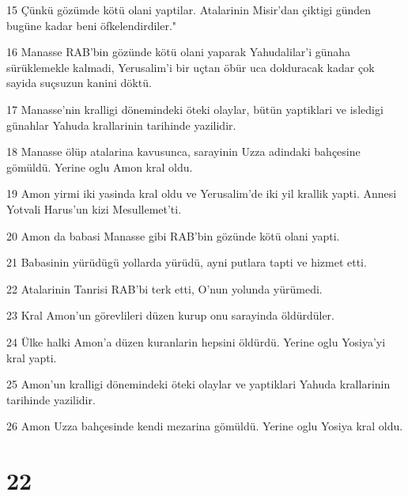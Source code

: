 \par 15 Çünkü gözümde kötü olani yaptilar. Atalarinin Misir'dan çiktigi günden bugüne kadar beni öfkelendirdiler."
\par 16 Manasse RAB'bin gözünde kötü olani yaparak Yahudalilar'i günaha sürüklemekle kalmadi, Yerusalim'i bir uçtan öbür uca dolduracak kadar çok sayida suçsuzun kanini döktü.
\par 17 Manasse'nin kralligi dönemindeki öteki olaylar, bütün yaptiklari ve isledigi günahlar Yahuda krallarinin tarihinde yazilidir.
\par 18 Manasse ölüp atalarina kavusunca, sarayinin Uzza adindaki bahçesine gömüldü. Yerine oglu Amon kral oldu.
\par 19 Amon yirmi iki yasinda kral oldu ve Yerusalim'de iki yil krallik yapti. Annesi Yotvali Harus'un kizi Mesullemet'ti.
\par 20 Amon da babasi Manasse gibi RAB'bin gözünde kötü olani yapti.
\par 21 Babasinin yürüdügü yollarda yürüdü, ayni putlara tapti ve hizmet etti.
\par 22 Atalarinin Tanrisi RAB'bi terk etti, O'nun yolunda yürümedi.
\par 23 Kral Amon'un görevlileri düzen kurup onu sarayinda öldürdüler.
\par 24 Ülke halki Amon'a düzen kuranlarin hepsini öldürdü. Yerine oglu Yosiya'yi kral yapti.
\par 25 Amon'un kralligi dönemindeki öteki olaylar ve yaptiklari Yahuda krallarinin tarihinde yazilidir.
\par 26 Amon Uzza bahçesinde kendi mezarina gömüldü. Yerine oglu Yosiya kral oldu.

\chapter{22}

